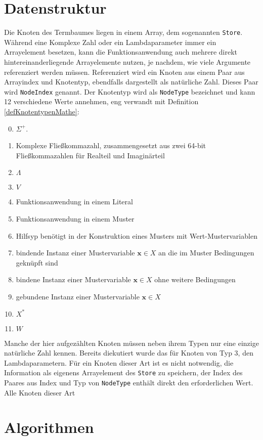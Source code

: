\section{Datenstruktur}
Die Knoten des Termbaumes liegen in einem Array, dem sogenannten \verb|Store|. Während eine Komplexe Zahl oder ein Lambdaparameter immer ein Arrayelement besetzen, kann die Funktionsanwendung auch mehrere direkt hintereinanderliegende Arrayelemente nutzen, je nachdem, wie viele Argumente referenziert werden müssen. Referenziert wird ein Knoten aus einem Paar aus Arrayindex und Knotentyp, ebendfalls dargestellt als natürliche Zahl. Dieses Paar wird \verb|NodeIndex| genannt. Der Knotentyp wird als \verb|NodeType| bezeichnet und kann 12 verschiedene Werte annehmen, eng verwandt mit Definition \ref{defKnotentypenMathe}:
\begin{enumerate}
	\setcounter{enumi}{-1} %
	\item {$\Sigma^+$.}
	\item {Komplexe Fließkommazahl, zusammengesetzt aus zwei 64-bit Fließkommazahlen für Realteil und Imaginärteil}
	\item {$\Lambda$}
	\item {$V$}
	\item {Funktionsanwendung in einem Literal}
	\item {Funktionsanwendung in einem Muster}
	\item {Hilfsyp benötigt in der Konstruktion eines Musters mit Wert-Mustervariablen}
	\item {bindende Instanz einer Mustervariable $\mathbf x \in X$ an die im Muster Bedingungen geknüpft sind}
	\item {bindene Instanz einer Mustervariable $\mathbf x \in X$ ohne weitere Bedingungen}
	\item {gebundene Instanz einer Mustervariable $\mathbf x \in X$}
	\item {$X^*$}
	\item {$W$}
\end{enumerate}
Manche der hier aufgezählten Knoten müssen neben ihrem Typen nur eine einzige natürliche Zahl kennen. Bereits diekutiert wurde das für Knoten von Typ $3$, den Lambdaparametern. Für ein Knoten dieser Art ist es nicht notwendig, die Information als eigenens Arrayelement des \verb|Store| zu speichern, der Index des Paares aus Index und Typ von \verb|NodeType| enthält direkt den erforderlichen Wert. Alle Knoten dieser Art


\section{Algorithmen} \label{subsecCppAlgos}
















